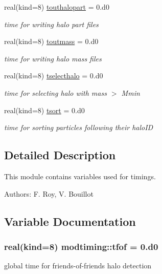 \begin{DoxyCompactItemize}
real(kind=8) \hyperlink{namespacemodtiming_ac41b305f5582ff3ca37058380003cfc7}{touthalopart} = 0.d0
\begin{DoxyCompactList}\small\item\em time for writing halo part files \end{DoxyCompactList}\item 
real(kind=8) \hyperlink{namespacemodtiming_a03a912e0243fcfbdec3ceeae3a34963a}{toutmass} = 0.d0
\begin{DoxyCompactList}\small\item\em time for writing halo mass files \end{DoxyCompactList}\item 
real(kind=8) \hyperlink{namespacemodtiming_a0e46279061d4681c9c8b5a055410f04b}{tselecthalo} = 0.d0
\begin{DoxyCompactList}\small\item\em time for selecting halo with mass $>$ Mmin \end{DoxyCompactList}\item 
real(kind=8) \hyperlink{namespacemodtiming_a32142e111b00eb8590746eef1b1d9dd6}{tsort} = 0.d0
\begin{DoxyCompactList}\small\item\em time for sorting particles following their halo\+ID \end{DoxyCompactList}\end{DoxyCompactItemize}


\subsection{Detailed Description}
This module contains variables used for timings. 

Authors\+: F. Roy, V. Bouillot 

\subsection{Variable Documentation}
\subsubsection[{\texorpdfstring{tfof}{tfof}}]{\setlength{\rightskip}{0pt plus 5cm}real(kind=8) modtiming\+::tfof = 0.d0}\hypertarget{namespacemodtiming_ac6dbf200ea4d6d6248bb9df21ed8d2a7}{}\label{namespacemodtiming_ac6dbf200ea4d6d6248bb9df21ed8d2a7}


global time for friends-\/of-\/friends halo detection 



